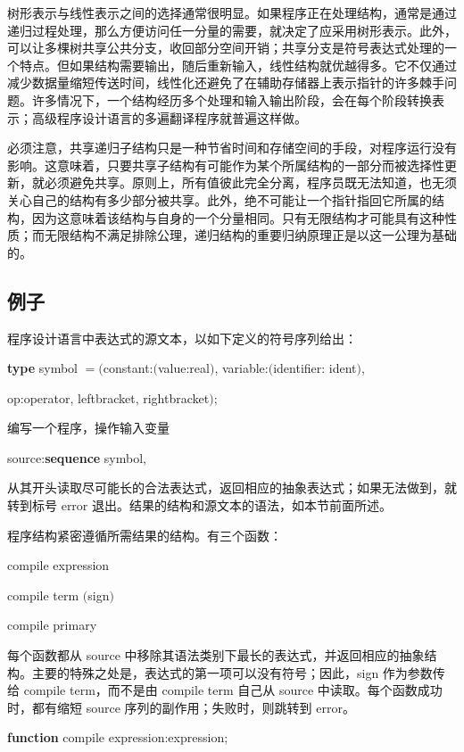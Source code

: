 树形表示与线性表示之间的选择通常很明显。如果程序正在处理结构，通常是通过递归过程处理，那么方便访问任一分量的需要，就决定了应采用树形表示。此外，可以让多棵树共享公共分支，收回部分空间开销；共享分支是符号表达式处理的一个特点。但如果结构需要输出，随后重新输入，线性结构就优越得多。它不仅通过减少数据量缩短传送时间，线性化还避免了在辅助存储器上表示指针的许多棘手问题。许多情况下，一个结构经历多个处理和输入输出阶段，会在每个阶段转换表示；高级程序设计语言的多遍翻译程序就普遍这样做。

必须注意，共享递归子结构只是一种节省时间和存储空间的手段，对程序运行没有影响。这意味着，只要共享子结构有可能作为某个所属结构的一部分而被选择性更新，就必须避免共享。原则上，所有值彼此完全分离，程序员既无法知道，也无须关心自己的结构有多少部分被共享。此外，绝不可能让一个指针指回它所属的结构，因为这意味着该结构与自身的一个分量相同。只有无限结构才可能具有这种性质；而无限结构不满足排除公理，递归结构的重要归纳原理正是以这一公理为基础的。

\subsection{例子}
\label{sec:example-9-2}

程序设计语言中表达式的源文本，以如下定义的符号序列给出：

\quad \textbf{type} symbol $= ($constant:$($value:real$)$, variable:$($identifier: ident$)$,

\tabto*{9.2em}op:operator, leftbracket, rightbracket$)$;

编写一个程序，操作输入变量

\quad source:\textbf{sequence} symbol,

\noindent
从其开头读取尽可能长的合法表达式，返回相应的抽象表达式；如果无法做到，就转到标号 error 退出。结果的结构和源文本的语法，如本节前面所述。

程序结构紧密遵循所需结果的结构。有三个函数：

\quad compile expression

\quad compile term $($sign$)$

\quad compile primary

\noindent
每个函数都从 source 中移除其语法类别下最长的表达式，并返回相应的抽象结构。主要的特殊之处是，表达式的第一项可以没有符号；因此，sign 作为参数传给 compile term，而不是由 compile term 自己从 source 中读取。每个函数成功时，都有缩短 source 序列的副作用；失败时，则跳转到 error。

\noindent
\textbf{function} compile expression:expression;

